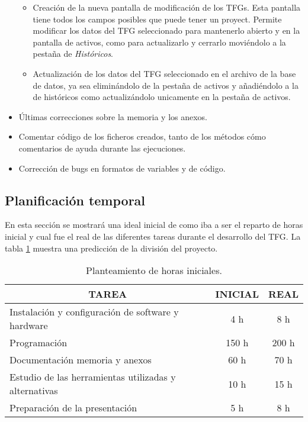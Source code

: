 \begin{itemize}
\begin{itemize}
		\item Creación de la nueva pantalla de modificación de los TFGs. Esta pantalla tiene todos los campos posibles que puede tener un proyect. Permite modificar los datos del TFG seleccionado para mantenerlo abierto y en la pantalla de activos, como para actualizarlo y cerrarlo moviéndolo a la pestaña de \emph{Históricos}.
		\item Actualización de los datos del TFG seleccionado en el archivo de la base de datos, ya sea eliminándolo de la pestaña de activos y añadiéndolo a la de históricos como actualizándolo unicamente en la pestaña de activos.
	\end{itemize}
	\item Últimas correcciones sobre la memoria y los anexos.
	\item Comentar código de los ficheros creados, tanto de los métodos cómo comentarios de ayuda durante las ejecuciones.
	\item Corrección de bugs en formatos de variables y de código.
	
\end{itemize}

\subsection{Planificación temporal}

En esta sección se mostrará una ideal inicial de como iba a ser el reparto de horas inicial y cual fue el real de las diferentes tareas durante el desarrollo del TFG. La tabla \ref{horas} muestra una predicción de la división del proyecto.

\begin{table}[]
	\label{horas}
	\centering
	\begin{tabular}{|l|c|c|}
		\hline
		\multicolumn{1}{|c|}{\textbf{TAREA}}     & \textbf{INICIAL} & \textbf{REAL} \\ \hline
		Instalación y configuración de software y hardware & 4 h & 8 h  \\ \hline
		Programación                            & 150 h  & 200 h       \\ \hline
		Documentación memoria y anexos          & 60 h   & 70 h     \\ \hline
		Estudio de las herramientas utilizadas y alternativas & 10 h & 15 h \\ \hline
		Preparación de la presentación		    & 5 h   & 8 h        \\ \hline
	\end{tabular}
	\caption{Planteamiento de horas iniciales.}
\end{table}


